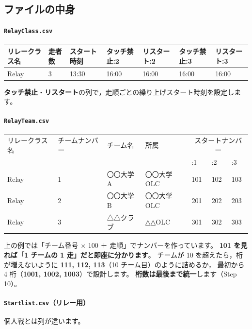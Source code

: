 \subsection*{ファイルの中身}

\paragraph{\texttt{RelayClass.csv}}
\begin{center}
\small
\begin{tabular}{@{}lllllll@{}}
\toprule
リレークラス名 & 走者数 & スタート時刻 & タッチ禁止:2 & リスタート:2 & タッチ禁止:3 & リスタート:3 \\
\midrule
Relay & 3 & 13:30 & 16:00 & 16:00 & 16:00 & 16:00 \\
\bottomrule
\end{tabular}
\end{center}
\textbf{タッチ禁止}・\textbf{リスタート}の列で，走順ごとの繰り上げスタート時刻を設定します。

\paragraph{\texttt{RelayTeam.csv}}
\begin{center}
\small
\begin{tabular}{@{}lllllll@{}}
\toprule
リレークラス名 & チームナンバー & チーム名 & 所属 & \multicolumn{3}{c}{スタートナンバー} \\
 & & & & :1 & :2 & :3 \\
\midrule
Relay & 1 & 〇〇大学A & 〇〇大学OLC & 101 & 102 & 103 \\
Relay & 2 & 〇〇大学B & 〇〇大学OLC & 201 & 202 & 203 \\
Relay & 3 & △△クラブ & △△OLC & 301 & 302 & 303 \\
\bottomrule
\end{tabular}
\end{center}

\begin{Note}[ここでもゼッケン番号の設計が効く]
上の例では「チーム番号 $\times$ 100 ＋ 走順」でナンバーを作っています。
\textbf{101 を見れば「1 チームの 1 走」だと即座に分かります}。
チームが 10 を超えたら，桁が増えないように
\textbf{111, 112, 113}（10 チーム目）のように詰めるか，
最初から 4 桁（\textbf{1001, 1002, 1003}）で設計します。
\textbf{桁数は最後まで統一}します（Step 10）。
\end{Note}

\paragraph{\texttt{Startlist.csv}（リレー用）}
個人戦とは列が違います。


